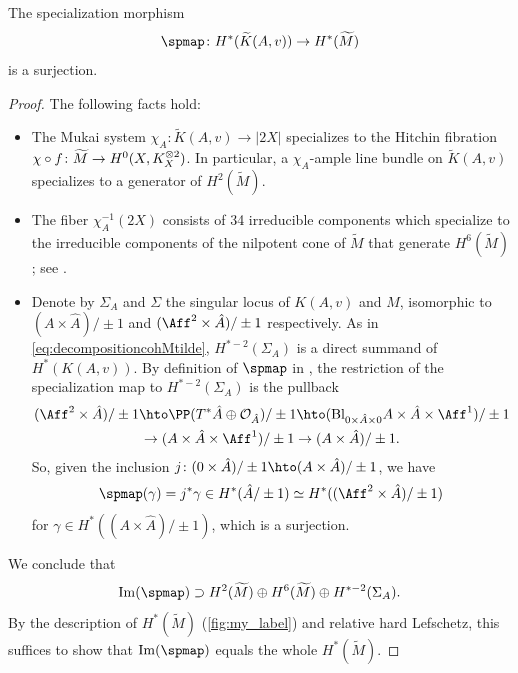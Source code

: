 \begin{exa}
\begin{prop}\label{prop:surjspeci}
The specialization morphism \emph{\cite[(86)]{deCataldoMaulikShen2019}}
\[
\spmap \colon H^*(\widetilde{K}(A,v)) \to H^*(\widetilde{M})
\]
is a surjection.
\end{prop}
\begin{proof}The following facts hold:
\begin{itemize}
\item The Mukai system $\chi_A \colon \widetilde{K}(A,v) \to |2X|$ specializes to the Hitchin fibration $\chi \circ\nobreak f \colon \widetilde{M} \to H^0(X,K^{\otimes 2}_X)$. In particular, a $\chi_A$-ample line bundle on $\widetilde{K}(A,v)$ specia\-lizes to a generator of $H^2(\widetilde{M})$.
\item The fiber $\chi_A^{-1}(2X)$ consists of 34 irreducible components which specialize to the irreducible components of the nilpotent cone of $\widetilde{M}$ that generate $H^6(\widetilde{M})$; see \cite[Prop.\,3.0.3]{Wu2021}.
\item Denote by $\Sigma_A$ and $\Sigma$ the singular locus of ${K}(A,v)$ and $M$, isomorphic to \hbox{$(A \times \hat{A})/\pm 1$} and $(\Aff^2 \times \hat{A})/\pm 1$ respectively. As in \eqref{eq:decompositioncohMtilde}, $H^{*-2}(\Sigma_A)$ is a direct summand of $H^*(K(A,v))$. By definition of $\spmap$ in \cite[(86)]{deCataldoMaulikShen2019}, the restriction of the specialization map to $H^{*-2}(\Sigma_A)$ is the pullback
\begin{multline*}
(\Aff^2 \times \hat{A})/\pm 1 \hto \PP(T^*\hat{A} \oplus \mathcal{O}_{\hat{A}})/\pm 1 \hto (\mathrm{Bl}_{0 \times \hat{A} \times 0}A \times \hat{A} \times \Aff^1)/\pm 1 \\
\to (A \times \hat{A} \times \Aff^1)/\pm 1 \to (A \times \hat{A})/\pm 1.
\end{multline*}
So, given the inclusion $j \colon (0 \times \hat{A})/\pm 1 \hto (A \times \hat{A})/\pm 1$, we have
\[
\spmap(\gamma)=j^*\gamma \in H^*( \hat{A}/\pm 1)\simeq H^*( (\Aff^2 \times \hat{A})/\pm 1)
\]
for $\gamma \in H^*((A \times \hat{A})/\pm 1)$, which is a surjection.
\end{itemize}
We conclude that
\[
\mathrm{Im}(\spmap) \supset H^2(\widetilde{M}) \oplus H^6(\widetilde{M}) \oplus H^{*-2}(\Sigma_A).
\]
By the description of $H^*(\widetilde{M})$ (\cf \cref{fig:my_label}) and relative hard Lefschetz, this suffices to show that $\mathrm{Im}(\spmap)$ equals the whole $H^*(\widetilde{M})$.
\end{proof}
\end{exa}

